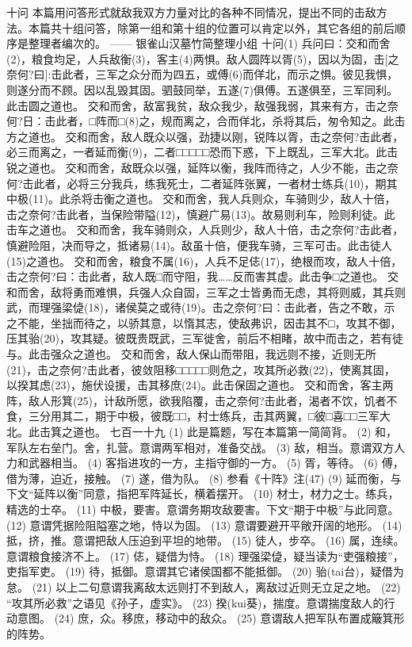 \documentclass[12pt,UTF8]{ctexbook}
\begin{document}
十问
本篇用问答形式就敌我双方力量对比的各种不同情况，提出不同的击敌方法。本篇共十组问答，除第一组和第十组的位置可以肯定以外，其它各组的前后顺序是整理者编次的。
—— 银雀山汉墓竹简整理小组
十问(1)
兵问曰：交和而舍(2)，粮食均足，人兵敌衡(3)，客主(4)两惧。敌人圆阵以胥(5)，因以为固，击[之奈何?曰]:击此者，三军之众分而为四五，或傅(6)而佯北，而示之惧。彼见我惧，则遂分而不顾。因以乱毁其固。驷鼓同举，五遂(7)俱傅。五遂俱至，三军同利。此击圆之道也。
交和而舍，敌富我贫，敌众我少，敌强我弱，其来有方，击之奈何?日：击此者，□阵而□(8)之，规而离之，合而佯北，杀将其后，匆令知之。此击方之道也。
交和而舍，敌人既众以强，劲捷以刚，锐阵以胥，击之奈何?击此者，必三而离之，一者延而衡(9)，二者□□□□□恐而下惑，下上既乱，三军大北。此击锐之道也。
交和而舍，敌既众以强，延阵以衡，我阵而待之，人少不能，击之奈何?击此者，必将三分我兵，练我死士，二者延阵张翼，一者材士练兵(10)，期其中极(11)。此杀将击衡之道也。
交和而舍，我人兵则众，车骑则少，敌人十倍，击之奈何?击此者，当保险带隘(12)，慎避广易(13)。故易则利车，险则利徒。此击车之道也。
交和而舍，我车骑则众，人兵则少，敌人十倍，击之奈何?击此者，慎避险阻，决而导之，抵诸易(14)。敌虽十倍，便我车骑，三军可击。此击徒人(15)之道也。
交和而舍，粮食不属(16)，人兵不足俧(17)，绝根而攻，敌人十倍，击之奈何?曰：击此者，敌人既□而守阻，我……反而害其虚。此击争□之道也。
交和而舍，敌将勇而难惧，兵强人众自固，三军之士皆勇而无虑，其将则威，其兵则武，而理强梁偼(18)，诸侯莫之或待(19)。击之奈何?曰：击此者，告之不敢，示之不能，坐拙而待之，以骄其意，以惰其志，使敌弗识，因击其不□，攻其不御，压其骀(20)，攻其疑。彼既贵既武，三军徙舍，前后不相睹，故中而击之，若有徒与。此击强众之道也。
交和而舍，敌人保山而带阻，我远则不接，近则无所(21)，击之奈何?击此者，彼敛阻移□□□□□则危之，攻其所必救(22)，使离其固，以揆其虑(23)，施伏设援，击其移庶(24)。此击保固之道也。
交和而舍，客主两阵，敌人形箕(25)，计敌所愿，欲我陷覆，击之奈何?击此者，渴者不饮，饥者不食，三分用其二，期于中极，彼既□□，村士练兵，击其两翼，□彼□喜□□三军大北。此击箕之道也。
七百一十九
(1) 此是篇题，写在本篇第一简简背。
(2) 和，军队左右垒门。舍，扎营。意谓两军相对，准备交战。
(3) 敌，相当。意谓双方人力和武器相当。
(4) 客指进攻的一方，主指守御的一方。
(5) 胥，等待。
(6) 傅，借为薄，迫近，接触。
(7) 遂，借为队。
(8) 参看《十阵》注(47)
(9) 延而衡，与下文“延阵以衡”同意，指把军阵延长，横着摆开。
(10) 材士，材力之士。练兵，精选的士卒。
(11) 中极，要害。意谓务期攻敌要害。下文“期于中极”与此同意。
(12) 意谓凭据险阻隘塞之地，恃以为固。
(13) 意谓要避开平敞开阔的地形。
(14) 抵，挤，推。意谓把敌人压迫到平坦的地带。
(15) 徒人，步卒。
(16) 属，连续。意谓粮食接济不上。
(17) 俧，疑借为恃。
(18) 理强梁偼，疑当读为“吏强粮接”，吏指军吏。
(19) 待，抵御。意谓其它诸侯国都不能抵御。
(20) 骀(tai台)，疑借为怠。
(21) 以上二句意谓我离敌太远则打不到敌人，离敌过近则无立足之地。
(22) “攻其所必救”之语见《孙子，虚实》。
(23) 揆(kui葵)，揣度。意谓揣度敌人的行动意图。
(24) 庶，众。移庶，移动中的敌众。
(25) 意谓敌人把军队布置成簸箕形的阵势。
\end{document}

